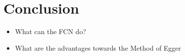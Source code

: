 \chapter{Conclusion}
	\begin{itemize}
		\item What can the FCN do?
		\item What are the advantages towards the Method of Egger
	\end{itemize}